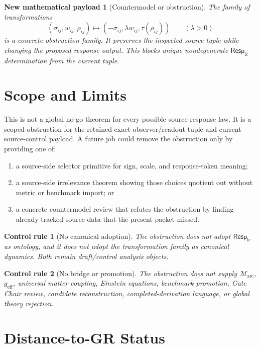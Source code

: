 \documentclass[11pt]{article}
\newcommand{\Msrc}{\mathcal{M}_{\mathrm{src}}}
\newcommand{\RespLC}{\mathsf{Resp}_{\mathrm{lc}}}
\newcommand{\geff}{g_{\mathrm{eff}}}
\newtheorem{controlrule}{Control rule}
\newtheorem{payload}{New mathematical payload}
\begin{document}
\begin{payload}[Countermodel or obstruction]
The family of transformations
\[
    (\sigma_{ij},w_{ij},\rho_{ij})
    \mapsto
    (-\sigma_{ij},\lambda w_{ij},\tau(\rho_{ij}))
    \qquad(\lambda>0)
\]
is a concrete obstruction family. It preserves the inspected source
tuple while changing the proposed response output. This blocks unique
nondegenerate \(\RespLC\) determination from the current tuple.
\end{payload}

\section{Scope and Limits}

This is not a global no-go theorem for every possible source response
law. It is a scoped obstruction for the retained exact
observer/readout tuple and current source-control payload. A future
job could remove the obstruction only by providing one of:
\begin{enumerate}
    \item a source-side selector primitive for sign, scale, and
    response-token meaning;
    \item a source-side irrelevance theorem showing those choices
    quotient out without metric or benchmark import; or
    \item a concrete countermodel review that refutes the obstruction
    by finding already-tracked source data that the present packet
    missed.
\end{enumerate}

\begin{controlrule}[No canonical adoption]
The obstruction does not adopt \(\RespLC\) as ontology, and it does not
adopt the transformation family as canonical dynamics. Both remain
draft/control analysis objects.
\end{controlrule}

\begin{controlrule}[No bridge or promotion]
The obstruction does not supply \(\Msrc\), \(\geff\), universal matter
coupling, Einstein equations, benchmark promotion, Gate Chair review,
candidate reconstruction, completed-derivation language, or global
theory rejection.
\end{controlrule}

\section{Distance-to-GR Status}
\end{document}
